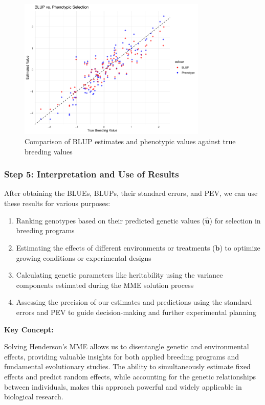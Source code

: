 \documentclass[12pt,a4paper]{article}
\newenvironment{keyconceptbox}[1][]
{\begin{basebox}[linecolor=uqblue]
\textbf{\color{uqblue}Key Concept:} \textit{#1}\par\noindent\ignorespaces}
{\end{basebox}}
\begin{document}
\begin{figure}[htbp]
  \centering
  \includegraphics[width=0.8\textwidth]{blup_vs_phenotype.pdf}
  \caption{Comparison of BLUP estimates and phenotypic values against true breeding values}
  \label{fig:blup_vs_phenotype}
\end{figure}

\subsubsection{Step 5: Interpretation and Use of Results}

After obtaining the BLUEs, BLUPs, their standard errors, and PEV, we can use these results for various purposes:

\begin{enumerate}
    \item Ranking genotypes based on their predicted genetic values ($\hat{\mathbf{u}}$) for selection in breeding programs
    \item Estimating the effects of different environments or treatments ($\hat{\mathbf{b}}$) to optimize growing conditions or experimental designs
    \item  Calculating genetic parameters like heritability using the variance components estimated during the MME solution process
    \item Assessing the precision of our estimates and predictions using the standard errors and PEV to guide decision-making and further experimental planning
\end{enumerate}

\begin{keyconceptbox}
Solving Henderson's MME allows us to disentangle genetic and environmental effects, providing valuable insights for both applied breeding programs and fundamental evolutionary studies. The ability to simultaneously estimate fixed effects and predict random effects, while accounting for the genetic relationships between individuals, makes this approach powerful and widely applicable in biological research.
\end{keyconceptbox}
\end{document}
